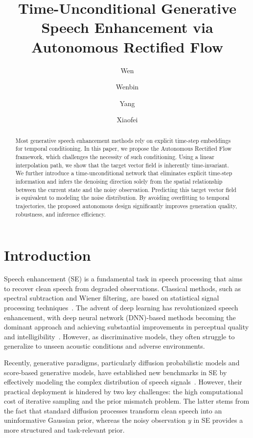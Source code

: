 \documentclass[cameraready]{Interspeech}
\title{Time-Unconditional Generative Speech Enhancement via Autonomous Rectified Flow}
\author[affiliation={1}, orcid=0009-0006-2552-1234]{Wen}{Zhang}
\author[affiliation={1}, orcid=0000-0002-4063-8952, correspondingauthor]{Wenbin}{Jiang}
\author[affiliation={1}, orcid=0009-0006-1175-0749]{Yang}{Zhang}
\author[affiliation={2}, orcid=0000-0002-7977-9728]{Xiaofei}{Zhou}
\begin{document}
\maketitle

\begin{abstract}
Most generative speech enhancement methods rely on explicit time-step embeddings for temporal conditioning. In this paper, we propose the Autonomous Rectified Flow framework, which challenges the necessity of such conditioning. Using a linear interpolation path, we show that the target vector field is inherently time-invariant. We further introduce a time-unconditional network that eliminates explicit time-step information and infers the denoising direction solely from the spatial relationship between the current state and the noisy observation. Predicting this target vector field is equivalent to modeling the noise distribution. By avoiding overfitting to temporal trajectories, the proposed autonomous design significantly improves generation quality, robustness, and inference efficiency.
\end{abstract}

\section{Introduction}

Speech enhancement (SE) is a fundamental task in speech processing that aims to recover clean speech from degraded observations. Classical methods, such as spectral subtraction and Wiener filtering, are based on statistical signal processing techniques~\cite{loizou2007speech}. The advent of deep learning has revolutionized speech enhancement, with deep neural network (DNN)-based methods becoming the dominant approach and achieving substantial improvements in perceptual quality and intelligibility~\cite{hendriks2013dft,jiang2023,jiang_unse_taslp,jiang2026selfse}. However, as discriminative models, they often struggle to generalize to unseen acoustic conditions and adverse environments.

Recently, generative paradigms, particularly diffusion probabilistic models and score-based generative models, have established new benchmarks in SE by effectively modeling the complex distribution of speech signals~\cite{welker22_interspeech,10149431,ho2020denoising,Lemercier_2023}. However, their practical deployment is hindered by two key challenges: the high computational cost of iterative sampling and the prior mismatch problem. The latter stems from the fact that standard diffusion processes transform clean speech into an uninformative Gaussian prior, whereas the noisy observation $y$ in SE provides a more structured and task-relevant prior.
\end{document}
